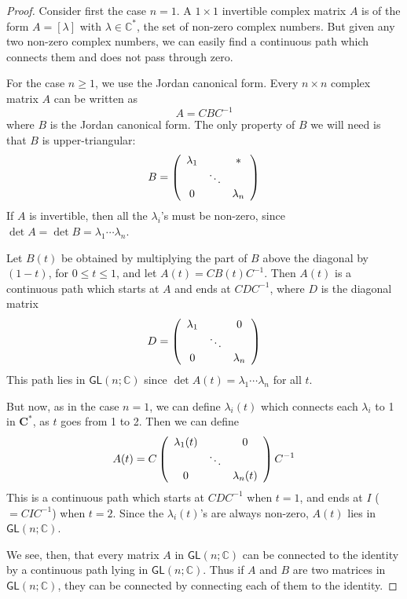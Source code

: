 \documentclass{amsbook}
\theoremstyle{plain}
\numberwithin{equation}{chapter}
\numberwithin{theorem}{chapter}
\begin{document}
\begin{proof}
Consider first the case $n=1$. A $1\times1$ invertible complex matrix $A$ is
of the form $A=\left[  \lambda\right]  $ with $\lambda\in\mathbb{C}^{\ast}$,
the set of non-zero complex numbers. But given any two non-zero complex
numbers, we can easily find a continuous path which connects them and does not
pass through zero.

For the case $n\geq1$, we use the Jordan canonical form. Every $n\times n$
complex matrix $A$ can be written as
\[
A=CBC^{-1}%
\]
where $B$ is the Jordan canonical form. The only property of $B$ we will need
is that $B$ is upper-triangular:
\[
B=\left(
\begin{array}
[c]{ccc}%
\lambda_{1} &  & \ast\\
& \ddots & \\
0 &  & \lambda_{n}%
\end{array}
\right)
\]
If $A$ is invertible, then all the $\lambda_{i}$'s must be non-zero, since
$\det A=\det B=\lambda_{1}\cdots\lambda_{n}$.

Let $B(t)$ be obtained by multiplying the part of $B$ above the diagonal by
$(1-t)$, for $0\leq t\leq1$, and let $A(t)=CB(t)C^{-1}$. Then $A(t)$ is a
continuous path which starts at $A$ and ends at $CDC^{-1}$, where $D$ is the
diagonal matrix
\[
D=\left(
\begin{array}
[c]{ccc}%
\lambda_{1} &  & 0\\
& \ddots & \\
0 &  & \lambda_{n}%
\end{array}
\right)
\]
This path lies in $\mathsf{GL}(n;\mathbb{C})$ since $\det A(t)=\lambda
_{1}\cdots\lambda_{n}$ for all $t$.

But now, as in the case $n=1$, we can define $\lambda_{i}(t)$ which connects
each $\lambda_{i}$ to 1 in $\mathbf{C}^{\ast}$, as $t$ goes from 1 to 2. Then
we can define
\[
A(t)=C\left(
\begin{array}
[c]{ccc}%
\lambda_{1}(t) &  & 0\\
& \ddots & \\
0 &  & \lambda_{n}(t)
\end{array}
\right)  C^{-1}%
\]
This is a continuous path which starts at $CDC^{-1}$ when $t=1$, and ends at
$I$ ($=CIC^{-1}$) when $t=2$. Since the $\lambda_{i}(t)$'s are always
non-zero, $A(t)$ lies in $\mathsf{GL}(n;\mathbb{C})$.

We see, then, that every matrix $A$ in $\mathsf{GL}(n;\mathbb{C})$ can be
connected to the identity by a continuous path lying in $\mathsf{GL}%
(n;\mathbb{C})$. Thus if $A$ and $B$ are two matrices in $\mathsf{GL}%
(n;\mathbb{C})$, they can be connected by connecting each of them to the identity.
\end{proof}
\end{document}
